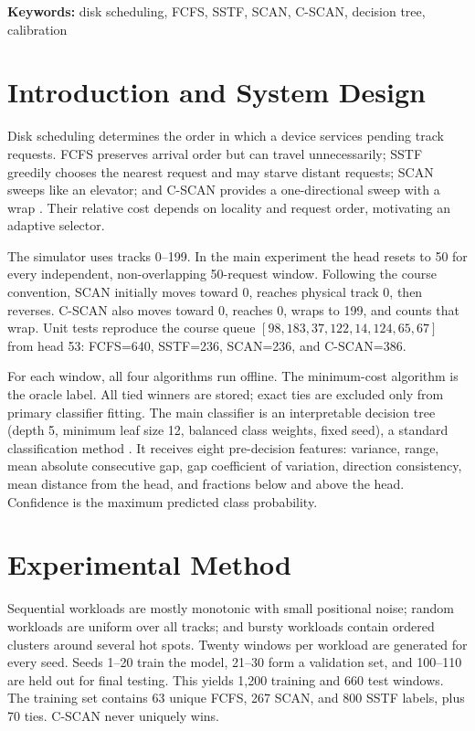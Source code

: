 \documentclass[10pt,a4paper]{article}
\begin{document}
\noindent\textbf{Keywords:} disk scheduling, FCFS, SSTF, SCAN, C-SCAN, decision tree, calibration

\section{Introduction and System Design}
Disk scheduling determines the order in which a device services pending track requests. FCFS preserves arrival order but can travel unnecessarily; SSTF greedily chooses the nearest request and may starve distant requests; SCAN sweeps like an elevator; and C-SCAN provides a one-directional sweep with a wrap \cite{osc}. Their relative cost depends on locality and request order, motivating an adaptive selector.

The simulator uses tracks 0--199. In the main experiment the head resets to 50 for every independent, non-overlapping 50-request window. Following the course convention, SCAN initially moves toward 0, reaches physical track 0, then reverses. C-SCAN also moves toward 0, reaches 0, wraps to 199, and counts that wrap. Unit tests reproduce the course queue $[98,183,37,122,14,124,65,67]$ from head 53: FCFS=640, SSTF=236, SCAN=236, and C-SCAN=386.

For each window, all four algorithms run offline. The minimum-cost algorithm is the oracle label. All tied winners are stored; exact ties are excluded only from primary classifier fitting. The main classifier is an interpretable decision tree (depth 5, minimum leaf size 12, balanced class weights, fixed seed), a standard classification method \cite{cart}. It receives eight pre-decision features: variance, range, mean absolute consecutive gap, gap coefficient of variation, direction consistency, mean distance from the head, and fractions below and above the head. Confidence is the maximum predicted class probability.

\section{Experimental Method}
Sequential workloads are mostly monotonic with small positional noise; random workloads are uniform over all tracks; and bursty workloads contain ordered clusters around several hot spots. Twenty windows per workload are generated for every seed. Seeds 1--20 train the model, 21--30 form a validation set, and 100--110 are held out for final testing. This yields 1,200 training and 660 test windows. The training set contains 63 unique FCFS, 267 SCAN, and 800 SSTF labels, plus 70 ties. C-SCAN never uniquely wins.
\end{document}
